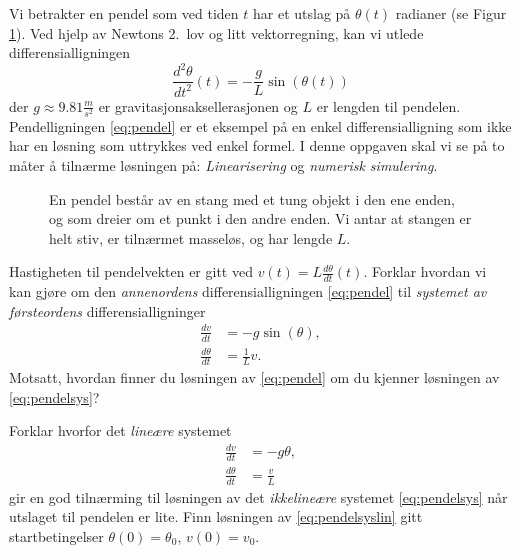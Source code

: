 \documentclass[11pt,norsk,a4paper]{article}
\begin{document}
\begin{oppgaver}
\oppgave 
Vi betrakter en pendel som ved tiden $t$ har et utslag på $\theta(t)$ radianer (se Figur \ref{fig:pendel}). Ved hjelp av Newtons 2.~lov og litt vektorregning, kan vi utlede differensialligningen
\begin{equation}\label{eq:pendel}
\frac{d^2\theta}{dt^2}(t) = -\frac{g}{L}\sin(\theta(t))
\end{equation}
der $g \approx 9.81 \frac{m}{s^2}$ er gravitasjonsaksellerasjonen og $L$ er lengden til pendelen. Pendelligningen \eqref{eq:pendel} er et eksempel på en enkel differensialligning som ikke har en løsning som uttrykkes ved enkel formel. I denne oppgaven skal vi se på to måter å tilnærme løsningen på: \emph{Linearisering} og \emph{numerisk simulering}.
\begin{figure}
\centering
{}
\caption{En pendel består av en stang med et tung objekt i den ene enden, og som dreier om et punkt i den andre enden. Vi antar at stangen er helt stiv, er tilnærmet masseløs, og har lengde $L$.}
\label{fig:pendel}
\end{figure}

\begin{deloppgaver}
\oppgave
Hastigheten til pendelvekten er gitt ved $v(t) = L\frac{d\theta}{dt}(t)$. Forklar hvordan vi kan gjøre om den \emph{annenordens} differensialligningen \eqref{eq:pendel} til \emph{systemet av førsteordens} differensialligninger
\begin{equation}\label{eq:pendelsys}
\begin{split}
\frac{dv}{dt} &= -g\sin(\theta), \\[2pt]
\frac{d\theta}{dt} &= \frac{1}{L}v.
\end{split}
\end{equation}
Motsatt, hvordan finner du løsningen av \eqref{eq:pendel} om du kjenner løsningen av  \eqref{eq:pendelsys}?

\oppgave
Forklar hvorfor det \emph{lineære} systemet
\begin{equation}\label{eq:pendelsyslin}
\begin{split}
\frac{dv}{dt} &= -g\theta ,\\[2pt]
\frac{d\theta}{dt} &= \frac{v}{L}
\end{split}
\end{equation}
gir en god tilnærming til løsningen av det \emph{ikkelineære} systemet \eqref{eq:pendelsys} når utslaget til pendelen er lite. Finn løsningen av \eqref{eq:pendelsyslin} gitt startbetingelser $\theta(0)=\theta_0$, $v(0)=v_0$.


\end{deloppgaver}
\end{oppgaver}
\end{document}
